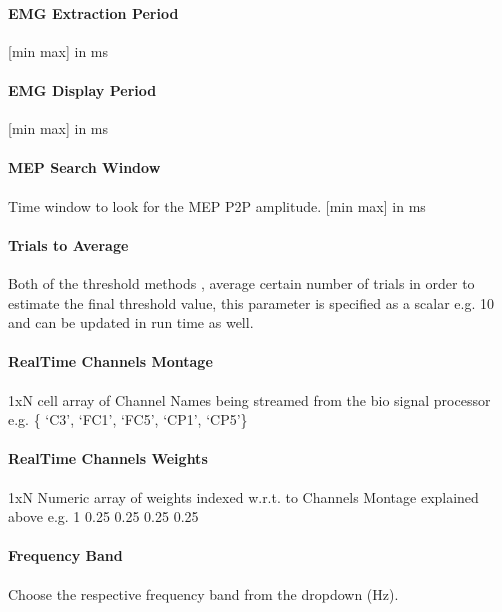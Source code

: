 \documentclass[letterpaper,10pt,english]{sphinxmanual}
\begin{document}
\paragraph{EMG Extraction Period}
\label{\detokenize{13_TUSIntervention:emg-extraction-period}}
\sphinxAtStartPar
{[}min max{]} in ms


\paragraph{EMG Display Period}
\label{\detokenize{13_TUSIntervention:emg-display-period}}
\sphinxAtStartPar
{[}min max{]} in ms


\paragraph{MEP Search Window}
\label{\detokenize{13_TUSIntervention:mep-search-window}}
\sphinxAtStartPar
Time window to look for the MEP P2P amplitude. {[}min max{]} in ms


\paragraph{Trials to Average}
\label{\detokenize{13_TUSIntervention:trials-to-average}}
\sphinxAtStartPar
Both of the threshold methods , average certain number of trials in order to estimate the final threshold value, this parameter is specified as a scalar e.g. 10 and can be updated in run time as well.


\paragraph{Real\sphinxhyphen{}Time Channels Montage}
\label{\detokenize{13_TUSIntervention:real-time-channels-montage}}
\sphinxAtStartPar
1xN cell array of Channel Names being streamed from the bio signal processor e.g. \{ ‘C3’, ‘FC1’, ‘FC5’, ‘CP1’, ‘CP5’\}


\paragraph{Real\sphinxhyphen{}Time Channels Weights}
\label{\detokenize{13_TUSIntervention:real-time-channels-weights}}
\sphinxAtStartPar
1xN Numeric array of weights indexed w.r.t. to Channels Montage explained above e.g. 1 \sphinxhyphen{}0.25 \sphinxhyphen{}0.25 \sphinxhyphen{}0.25 \sphinxhyphen{}0.25


\paragraph{Frequency Band}
\label{\detokenize{13_TUSIntervention:frequency-band}}
\sphinxAtStartPar
Choose the respective frequency band from the dropdown (Hz).
\end{document}
